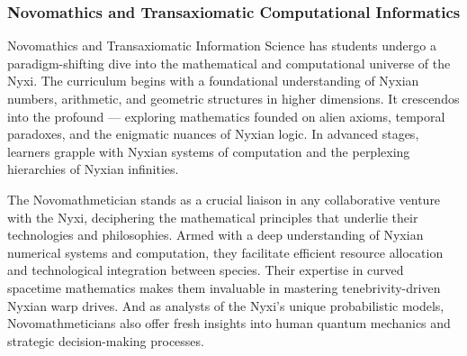 \subsubsection{Novomathics and Transaxiomatic Computational Informatics}
Novomathics and Transaxiomatic Information Science has students undergo a
paradigm-shifting dive into the mathematical and computational universe of the
Nyxi. The curriculum begins with a foundational understanding of Nyxian
numbers, arithmetic, and geometric structures in higher dimensions. It
crescendos into the profound — exploring mathematics founded on alien axioms,
temporal paradoxes, and the enigmatic nuances of Nyxian logic. In advanced
stages, learners grapple with Nyxian systems of computation and the perplexing
hierarchies of Nyxian infinities.

The Novomathmetician stands as a crucial liaison in any collaborative venture
with the Nyxi, deciphering the mathematical principles that underlie their
technologies and philosophies. Armed with a deep understanding of Nyxian
numerical systems and computation, they facilitate efficient resource
allocation and technological integration between species. Their expertise in
curved spacetime mathematics makes them invaluable in mastering
tenebrivity-driven Nyxian warp drives. And as analysts of the Nyxi's unique
probabilistic models, Novomathmeticians also offer fresh insights into human
quantum mechanics and strategic decision-making processes.